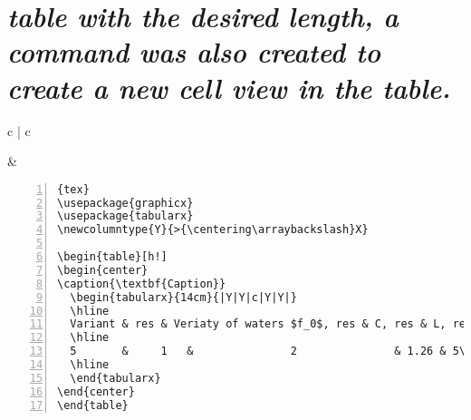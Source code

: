 \section{\textit{\small{table with the desired length, a command was also created to create a new cell view in the table.}}}
\begin{table}[h!]
\begin{tabular}{c | c}
\begin{minipage}[m]{0.4\textwidth}
\end{minipage}
&
\begin{minipage}[m]{0.55\textwidth}
\renewcommand\textminus{\mbox{-}}%
\begin{lstlisting}[numberstyle=\zebra{green!15}{yellow!15},numbers=left,basicstyle=\footnotesize]{tex}
\usepackage{graphicx}
\usepackage{tabularx}
\newcolumntype{Y}{>{\centering\arraybackslash}X}

\begin{table}[h!]
\begin{center}
\caption{\textbf{Caption}}
  \begin{tabularx}{14cm}{|Y|Y|c|Y|Y|}
  \hline
  Variant & res & Veriaty of waters $f_0$, res & C, res & L, res\\
  \hline
  5       &     1   &               2               & 1.26 & 5\\
  \hline
  \end{tabularx}
\end{center}
\end{table}
\end{lstlisting}
\end{minipage}
\end{tabular}
\end{table}

